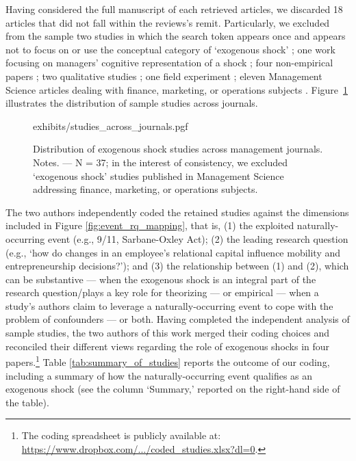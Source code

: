 \documentclass[11pt]{article}
\begin{document}
\begin{refsection}
Having considered the full manuscript of each retrieved articles, we discarded
18 articles that did not fall within the reviews's remit. Particularly, 
we excluded from the sample two studies in which the search token appears once
and 
appears not to focus on or use the conceptual category of `exogenous shock'
\autocite{uzzi199735,kriauciunas2006659}; one work focusing on managers'
cognitive representation of a shock \autocite{barreto2013687}; four
non-empirical papers
\autocite[e.g.,][]{mcsweeney2009933}; two qualitative studies
\autocite{glynn20051031, jenkins2010884}; one field experiment 
\autocite{cui20191216}; eleven Management Science articles dealing with 
finance, marketing, or operations subjects \autocite[e.g.,][]{tham20182901}.
Figure~\ref{fig:studies_across_journals} illustrates the distribution of sample
studies across journals.

\vspace{2em}

\begin{figure}[!htbp]
    \centering
    {exhibits/studies_across_journals.pgf}
    \caption{Distribution of exogenous shock studies across
    management journals.  Notes. --- N = 37; in the interest of consistency, we
    excluded `exogenous shock' studies published in Management Science
    addressing finance, marketing, or operations subjects.}
    \label{fig:studies_across_journals}
\end{figure}         

\vspace{2em}

The two authors independently coded the retained studies against the dimensions 
included in Figure \ref{fig:event_rq_mapping}, that is, (1) the exploited 
naturally-occurring event (e.g., 9/11, Sarbane-Oxley Act); (2) the leading
research question (e.g., `how do changes in an employee's relational capital
influence mobility and entrepreneurship decisions?'); and (3) the relationship
between (1) and (2), which can be substantive --- when the exogenous shock is an
integral part of the research question/plays a key role for theorizing 
--- or empirical --- when a study's authors claim to leverage a
naturally-occurring event to cope with the problem of confounders --- or both.
Having completed the independent analysis of sample studies, the two authors of
this work merged their coding choices and reconciled their different views
regarding the role of exogenous shocks in four papers.\footnote{The coding
spreadsheet is publicly available at: \href{
https://www.dropbox.com/s/yl0sf9p9tq253fy/coded_studies.csv?dl=0}
{https://www.dropbox.com/.../coded\_studies.xlsx?dl=0}.} Table
\ref{tab:summary_of_studies} reports the outcome of our coding, including a
summary of how the naturally-occurring event qualifies as an exogenous shock
(see the column `Summary,' reported on the right-hand side of the table).


\end{refsection}
\end{document}
